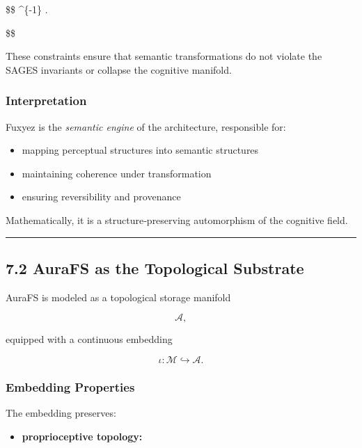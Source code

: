 \$\$ \^{}\{-1\} .

\$\$

These constraints ensure that semantic transformations do not violate the SAGES invariants or collapse the cognitive manifold.

\subsubsection{Interpretation}\label{interpretation}

Fuxyez is the \emph{semantic engine} of the architecture, responsible for:

\begin{itemize}
\tightlist
\item
  mapping perceptual structures into semantic structures\\
\item
  maintaining coherence under transformation\\
\item
  ensuring reversibility and provenance
\end{itemize}

Mathematically, it is a structure‑preserving automorphism of the cognitive field.

\begin{center}\rule{0.5\linewidth}{0.5pt}\end{center}

\subsection{7.2 AuraFS as the Topological Substrate}\label{aurafs-as-the-topological-substrate}

AuraFS is modeled as a topological storage manifold

\[
\mathcal{A},
\]

equipped with a continuous embedding

\[
\iota : \mathcal{M} \hookrightarrow \mathcal{A}.
\]

\subsubsection{Embedding Properties}\label{embedding-properties}

The embedding preserves:

\begin{itemize}
\tightlist
\item
  \textbf{proprioceptive topology:}
\end{itemize}

